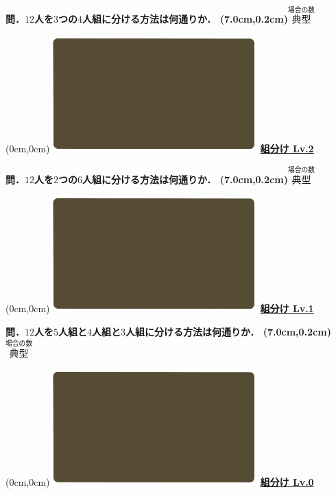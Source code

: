 \documentclass[10pt,
fleqn,
dvipdfmx,
uplatex
]{jsarticle}
\begin{document}
\huge 
\bf\boldmath 問．${12}$人を$3$つの$4$人組に分ける方法は何通りか．
\at(7.0cm,0.2cm){\small\color{bradorange}$\overset{\text{場合の数}}{\text{典型}}$}


\newpage



\at(0cm,0cm){\includegraphics[width=8cm,bb=0 0 1920 1080]{./youtube/thumbnails/templates/smart_background/場合の数.jpeg}}
{\color{orange}\bf\boldmath\huge\underline{組分け Lv.2 }}\vspace{0.3zw}

\huge 
\bf\boldmath 問．${12}$人を$2$つの$6$人組に分ける方法は何通りか．
\at(7.0cm,0.2cm){\small\color{bradorange}$\overset{\text{場合の数}}{\text{典型}}$}


\newpage



\at(0cm,0cm){\includegraphics[width=8cm,bb=0 0 1920 1080]{./youtube/thumbnails/templates/smart_background/場合の数.jpeg}}
{\color{orange}\bf\boldmath\huge\underline{組分け Lv.1 }}\vspace{0.3zw}

\LARGE 
\bf\boldmath 問．${12}$人を$5$人組と$4$人組と$3$人組に分ける方法は何通りか．
\at(7.0cm,0.2cm){\small\color{bradorange}$\overset{\text{場合の数}}{\text{典型}}$}


\newpage



\at(0cm,0cm){\includegraphics[width=8cm,bb=0 0 1920 1080]{./youtube/thumbnails/templates/smart_background/場合の数.jpeg}}
{\color{orange}\bf\boldmath\huge\underline{組分け Lv.0 }}\vspace{0.3zw}
\end{document}
